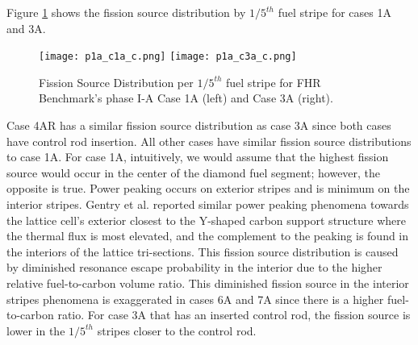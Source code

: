 Figure \ref{fig:phase1a-c} shows the fission source distribution by 
$1/5^{th}$ fuel stripe for cases 1A and 3A. 
\begin{figure}[]
    \centering
    \texttt{[image: p1a\_c1a\_c.png]} 
    \texttt{[image: p1a\_c3a\_c.png]} 
    \caption{Fission Source Distribution per $1/5^{th}$ fuel stripe for \gls{FHR} 
    Benchmark's phase I-A Case 1A (left) and Case 3A (right).}
    \label{fig:phase1a-c}
\end{figure}
Case 4AR has a similar fission source distribution as case 3A since both 
cases have control rod insertion. 
All other cases have similar fission source distributions to case 1A. 
For case 1A, intuitively, we would assume that the highest fission source would 
occur in the center of the diamond fuel segment; however, the opposite is true. 
Power peaking occurs on exterior stripes and is minimum on the interior stripes.
Gentry et al. \cite{gentry_development_2016} reported similar power peaking 
phenomena towards the lattice cell's exterior closest to the Y-shaped carbon 
support structure where the thermal flux is most elevated, and the complement 
to the peaking is found in the interiors of the lattice tri-sections. 
This fission source distribution is caused by diminished resonance escape 
probability in the interior due to the higher relative fuel-to-carbon volume 
ratio. 
This diminished fission source in the interior stripes phenomena is exaggerated 
in cases 6A and 7A since there is a higher fuel-to-carbon ratio.
For case 3A that has an inserted control rod, the fission source is lower in 
the $1/5^{th}$ stripes closer to the control rod.  

